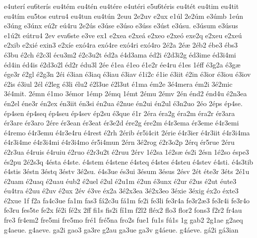 {e4uter^^ed
eu6ter^^eds
eu4t^^e9m
eu4t^^e9n
eu4t^^e9re
e4ut^^e9ri
e5u6t^^e9ris
eu4t^^e9t
eu4tim
eu4tit
eu4t^^edm
eu5tos
eutru4
eu4tun
eu4t^^fan
2euu
2e2uv
e2ux
e1^^fal
2e2^^fam
e3^^famb
1e^^fan
e3^^fang
e3^^fanx
e^^fa2r
e^^fa4ru
2e2^^fas
e3^^fase
e3^^faso
e3^^fass
e3^^fast
e3^^fasu.
e3^^fasum
e3^^fasus
e1^^fa2t
e^^fatru4
2ev
eva6ste
e3ve
ex1
e2xea
e2xe^^e1
e2xeo
e2xe^^f3
exe2q
e2xeu
e2xe^^fa
e2xib
e2xi^^e9
exin3
e2x^^ede
ex^^f34ra
ex^^f34re
ex^^f34ri
ex^^f34ro
2^^e92a
2^^e9^^e6
2^^e9b2
^^e9be3
^^e9bs3
^^e93bu
^^e92ch
^^e92c3l
^^e9cu3m2
^^e92c3u2t
^^e9d2a
^^e94d3ama
^^e9d2i
^^e92d3i2g
^^e9d3ime
^^e9d3i4mi
^^e9d4in
^^e9d4is
^^e92d3o2l
^^e9d2r
^^e9du3l
2^^e9e
^^e91ea
^^e91eo
^^e91e2r
^^e9e4ru
^^e91es
1^^e9ff
^^e93g2a
^^e93g^^e6
^^e9ge3r
^^e92gl
^^e92g3n
2^^e9i
^^e93ian
^^e93iaq
^^e93iau
^^e93iav
^^e91i2c
^^e91ie
^^e93iit
^^e92in
^^e93ior
^^e93iou
^^e93iov
^^e92is
^^e93iul
2^^e9l
^^e92leg
^^e93li
^^e9lu2
^^e92l3ue
^^e92l3ut
^^e91ma
^^e9m2e
3^^e94mera
^^e9m2i
3^^e92mic
3^^e94mit.
2^^e9mn
^^e91mo
3^^e9mor
1^^e9mp
2^^e9mq
1^^e9mt
2^^e9mu
2^^e9mv
2^^e9n
^^e9nd2
^^e9nd4u
^^e92n3ea
^^e9n2el
^^e9ne3r
^^e9n2ex
^^e9n3iit
^^e9n3si
^^e9n2ua
^^e92nue
^^e9n2ui
^^e9n2ul
^^e93n2uo
2^^e9o
2^^e9ps
^^e9p4se.
^^e9p4sen
^^e9p4seq
^^e9p4seu
^^e9p4sev
^^e9p2su
^^e93que
^^e91r
2^^e9ra
^^e9ra2g
^^e9ra2m
^^e9ra2r
^^e9r3ara
^^e9r3are
^^e9r3aro
2^^e9re
^^e9r3ean
^^e9r3eat
^^e9r3e2d
^^e9re2g
^^e9re2m
^^e94r3ema
^^e9r3eme
^^e94r3emi
^^e94remo
^^e94r3emu
^^e94r3e4ru
^^e94rest
^^e92rh
2^^e9rib
^^e9r5i4cit
2^^e9rie
^^e94r3ier
^^e94r3iit
^^e94r3i4ma
^^e94r3i4me
^^e94r3i4mi
^^e94r3i4mo
^^e9r5i4mun
2^^e9rn
3^^e92rog
^^e92r3o2p
2^^e9rq
^^e9r5rue
2^^e9ru
^^e92r3ua
^^e94ruis
^^e94ruiu
^^e92ruo
^^e92r3u2t
^^e92ruu
2^^e9rv
1^^e92sa
1^^e92s^^e6
^^e9s2i
2^^e9sn
1^^e92so
^^e9spe3
^^e9s2pu
2^^e92s3q
4^^e9sta
^^e94ste.
^^e94stem
^^e94stene
^^e94steq
^^e94stes
^^e94steu
^^e94stev
^^e94sti.
^^e94s3tib
^^e94stis
3^^e9stn
3^^e9stq
3^^e9stv
3^^e92su.
^^e94s3ue
^^e9s3ui
3^^e9sum
3^^e9sus
2^^e9sv
2^^e9t
^^e9te3r
3^^e9ts
2^^e91u
^^e92uam
^^e92uaq
^^e92uau
^^e9ub2
^^e92uel
^^e92ul
^^e92u1m
^^e92un
^^e93unx
^^e92ur
^^e92us
^^e92ut
^^e9ute3
^^e9u4tra
^^e92uu
^^e92uv
^^e92ux
2^^e9v
^^e93ve
^^e9x2a
3^^e92x3ea
3^^e92x3eo
3^^e9xie
3^^e9xig
^^e9x2o
^^e9xte3
^^e92xue
1f
f2a
fa4c3ue
fa1m
fas3
f^^e12c3u
f^^e11m
fe2i
fe3li
fe3r4a
fe3r2^^e63
fe3r4i
fe3r4o
fe3ru
fes5te
fe2x
f^^e92i
f^^e92x
2ff
fi1s
fis2i
f^^ed1m
f2l2
fl^^e9x2
flo3
flor2
fons3
f2r2
fr4au
fre3
fr4em2
fre5mi
fre5mo
fr^^e91
fr^^e95na
fro2s
fue1
fu1s
f^^fa1s
1g
gab2
2g1ae
g2aeq
g4aeue.
g4aeve.
ga2i
gao3
ga3re
g2au
ga3ue
ga3v
g4^^e1eue.
g4^^e1eve.
g^^e12i
g^^e13ian
}
